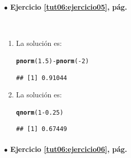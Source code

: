 \documentclass[10pt,a4paper]{article}\usepackage[]{graphicx}\usepackage[]{color}
\makeatletter
\newcommand{\hlnum}[1]{\textcolor[rgb]{0.686,0.059,0.569}{#1}}%
\newcommand{\hlopt}[1]{\textcolor[rgb]{0,0,0}{#1}}%
\newcommand{\hlstd}[1]{\textcolor[rgb]{0.345,0.345,0.345}{#1}}%
\newcommand{\hlkwd}[1]{\textcolor[rgb]{0.737,0.353,0.396}{\textbf{#1}}}%
\newenvironment{kframe}{%
 \def\at@end@of@kframe{}%
 \ifinner\ifhmode%
  \def\at@end@of@kframe{\end{minipage}}%
  \begin{minipage}{\columnwidth}%
 \fi\fi%
 \def\FrameCommand##1{\hskip\@totalleftmargin \hskip-\fboxsep
 \colorbox{shadecolor}{##1}\hskip-\fboxsep
     \hskip-\linewidth \hskip-\@totalleftmargin \hskip\columnwidth}%
 \MakeFramed {\advance\hsize-\width
   \@totalleftmargin\z@ \linewidth\hsize
   \@setminipage}}%
 {\par\unskip\endMakeFramed%
 \at@end@of@kframe}
\newenvironment{knitrout}{}{} %
\makeatother
\begin{document}
\paragraph{\bf $\bullet$ Ejercicio \ref{tut06:ejercicio05}, pág. \pageref{tut06:ejercicio05}}
\label{tut06:ejercicio05:sol}\quad\\

\begin{enumerate}
  \item La solución es:
\begin{knitrout}
\color{fgcolor}\begin{kframe}
\begin{alltt}
\hlkwd{pnorm}\hlstd{(}\hlnum{1.5}\hlstd{)} \hlopt{-} \hlkwd{pnorm}\hlstd{(}\hlopt{-}\hlnum{2}\hlstd{)}
\end{alltt}
\begin{verbatim}
## [1] 0.91044
\end{verbatim}
\end{kframe}
\end{knitrout}
  \item La solución es:
\begin{knitrout}
\color{fgcolor}\begin{kframe}
\begin{alltt}
\hlkwd{qnorm}\hlstd{(}\hlnum{1} \hlopt{-} \hlnum{0.25}\hlstd{)}
\end{alltt}
\begin{verbatim}
## [1] 0.67449
\end{verbatim}
\end{kframe}
\end{knitrout}
\end{enumerate}


\paragraph{\bf $\bullet$ Ejercicio \ref{tut06:ejercicio06}, pág. \pageref{tut06:ejercicio06}}
\label{tut06:ejercicio06:sol}\quad\\
\end{document}
